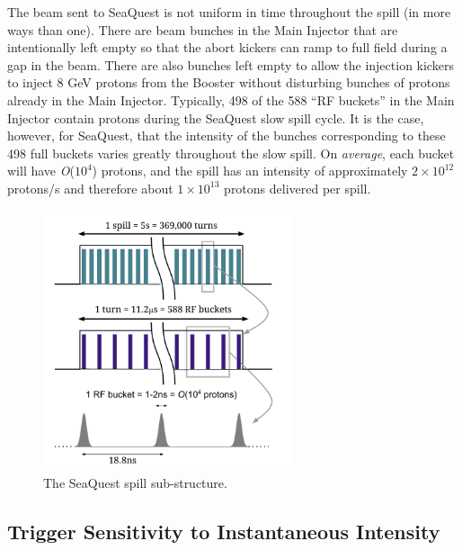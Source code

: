 The beam sent to SeaQuest is not uniform in time throughout the spill (in more ways than one).  There are beam bunches in the Main Injector that are intentionally left empty so that the abort kickers can ramp to full field during a gap in the beam. There are also bunches left empty to allow the injection kickers to inject 8 GeV protons from the Booster without disturbing bunches of protons already in the Main Injector.  Typically, 498 of the 588 ``RF buckets'' in the Main Injector contain protons during the SeaQuest slow spill cycle.  It is the case, however, for SeaQuest, that the intensity of the bunches corresponding to these 498 full buckets varies greatly throughout the slow spill. On \emph{average}, each bucket will have \emph{O}($10^4$) protons, and the spill has an intensity of approximately $2\times10^{12}$ protons/s and therefore about $1\times10^{13}$ protons delivered per spill.

\begin{figure}
	\begin{center}
		\includegraphics[width=0.65\textwidth]{figures/SpillStructure.pdf}
		\caption{The SeaQuest spill sub-structure.}
		\label{fig:SpillStructure}
	\end{center}
\end{figure}



\subsection{Trigger Sensitivity to Instantaneous Intensity}

